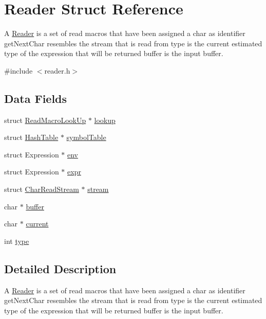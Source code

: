 \hypertarget{structReader}{\section{Reader Struct Reference}
\label{structReader}
}


A \hyperlink{structReader}{Reader} is a set of read macros that have been assigned a char as identifier get\+Next\+Char resembles the stream that is read from type is the current estimated type of the expression that will be returned buffer is the input buffer.  




{\ttfamily \#include $<$reader.\+h$>$}

\subsection*{Data Fields}
\begin{DoxyCompactItemize}
\item 
struct \hyperlink{structReadMacroLookUp}{Read\+Macro\+Look\+Up} $\ast$ \hyperlink{structReader_ab499edf7fb5b8117242b1b786c4ab378}{lookup}
\item 
struct \hyperlink{structHashTable}{Hash\+Table} $\ast$ \hyperlink{structReader_ac33ce204beac27fe100f45f529a8f526}{symbol\+Table}
\item 
struct Expression $\ast$ \hyperlink{structReader_ac5fc65c1058404fca08c43a02aeda206}{env}
\item 
struct Expression $\ast$ \hyperlink{structReader_abf488edc3cddacd7890d3cbbe975a49b}{expr}
\item 
struct \hyperlink{structCharReadStream}{Char\+Read\+Stream} $\ast$ \hyperlink{structReader_a3f36921203dbd6ab9098f489b42b7d16}{stream}
\item 
char $\ast$ \hyperlink{structReader_a1c37d0d8180619f0d46e938557fc6db7}{buffer}
\item 
char $\ast$ \hyperlink{structReader_a04492be827cfe1cb7974b61b65291b72}{current}
\item 
int \hyperlink{structReader_a6c814c1cc41dd53d9a293ae410d9a30b}{type}
\end{DoxyCompactItemize}


\subsection{Detailed Description}
A \hyperlink{structReader}{Reader} is a set of read macros that have been assigned a char as identifier get\+Next\+Char resembles the stream that is read from type is the current estimated type of the expression that will be returned buffer is the input buffer. 

